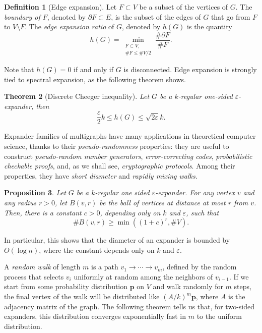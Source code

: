 \documentclass[10pt]{article}
\theoremstyle{plain}
\newtheorem{theorem}{Theorem}
\newtheorem{proposition}[theorem]{Proposition}
\theoremstyle{definition}
\newtheorem{definition}[theorem]{Definition}
\begin{document}
\begin{definition}[Edge expansion]
  Let $F⊂V$ be a subset of the vertices of $G$. %
  The \emph{boundary of $F$}, denoted by $∂F⊂E$, is the subset of the
  edges of $G$ that go from $F$ to $V\setminus F$. %
  The \emph{edge expansion ratio} of $G$, denoted by $h(G)$ is the
  quantity
  \[h(G) = \min_{\substack{F⊂V,\\ \#F≤\#V/2}}\frac{\#∂F}{\#F}.\]
\end{definition}

Note that $h(G)=0$ if and only if $G$ is disconnected. %
Edge expansion is strongly tied to spectral expansion, as the
following theorem shows.

\begin{theorem}[Discrete Cheeger inequality]
  Let $G$ be a $k$-regular one-sided $ε$-expander, then
  \[\frac{ε}{2}k≤h(G)≤\sqrt{2ε}k.\]
\end{theorem}

Expander families of multigraphs have many applications in theoretical
computer science, thanks to their \emph{pseudo-randomness} properties:
they are useful to construct \emph{pseudo-random number generators},
\emph{error-correcting codes}, \emph{probabilistic checkable proofs},
and, as we shall see, \emph{cryptographic protocols}. %
Among their properties, they have \emph{short diameter} and
\emph{rapidly mixing walks}.

\begin{proposition}
  \label{th:diameter}
  Let $G$ be a $k$-regular one sided $ε$-expander. %
  For any vertex $v$ and any radius $r>0$, let $B(v,r)$ be the
  \emph{ball} of vertices at distance at most $r$ from $v$. %
  Then, there is a constant $c>0$, depending only on $k$ and $ε$, such
  that
  \[\#B(v,r)≥\min((1+c)^r,\#V).\]
\end{proposition}

In particular, this shows that the diameter of an expander is bounded
by $O(\log n)$, where the constant depends only on $k$ and $ε$. %

A \emph{random walk} of length $m$ is a path $v_1\to\cdots\to v_m$,
defined by the random process that selects $v_i$ uniformly at random
among the neighbors of $v_{i-1}$. %
If we start from some probability distribution $\mathbf{p}$ on $V$ and
walk randomly for $m$ steps, the final vertex of the walk will be
distributed like $(A/k)^m\mathbf{p}$, where $A$ is the adjacency matrix of
the graph. %
The following theorem tells us that, for two-sided expanders, this
distribution converges exponentially fast in $m$ to the uniform
distribution.
\end{document}
